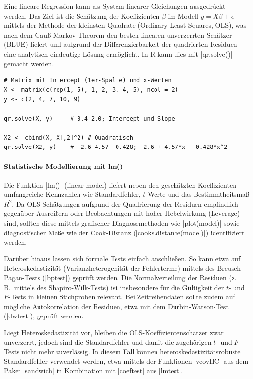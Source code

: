 \documentclass[10pt,twocolumn]{scrartcl}
\renewcommand{\lstinline}{\mycoloredinline}
\begin{document}
Eine lineare Regression kann als System linearer Gleichungen ausgedrückt werden. Das Ziel ist die Schätzung der Koeffizienten $\beta$ im Modell $y = X\beta + \epsilon$ mittels der Methode der kleinsten Quadrate (Ordinary Least Squares, OLS), was nach dem Gauß-Markov-Theorem den besten linearen unverzerrten Schätzer (BLUE) liefert und aufgrund der Differenzierbarkeit der quadrierten Residuen eine analytisch eindeutige Lösung ermöglicht. In R kann dies mit \lstinline|qr.solve()| gemacht werden.

\begin{lstlisting}
# Matrix mit Intercept (1er-Spalte) und x-Werten
X <- matrix(c(rep(1, 5), 1, 2, 3, 4, 5), ncol = 2)
y <- c(2, 4, 7, 10, 9)

qr.solve(X, y)     # 0.4 2.0; Intercept und Slope

X2 <- cbind(X, X[,2]^2) # Quadratisch
qr.solve(X2, y)    # -2.6 4.57 -0.428; -2.6 + 4.57*x - 0.428*x^2
\end{lstlisting}

\paragraph{Statistische Modellierung mit lm()}

Die Funktion \lstinline|lm()| (linear model) liefert neben den geschätzten Koeffizienten umfangreiche Kennzahlen wie Standardfehler, $t$-Werte und das Bestimmtheitsmaß $R^2$. Da OLS-Schätzungen aufgrund der Quadrierung der Residuen empfindlich gegenüber Ausreißern oder Beobachtungen mit hoher Hebelwirkung (Leverage) sind, sollten diese mittels grafischer Diagnosemethoden wie \lstinline|plot(model)| sowie diagnostischer Maße wie der Cook-Distanz (\lstinline|cooks.distance(model)|) identifiziert werden.

Darüber hinaus lassen sich formale Tests einfach anschließen. So kann etwa auf Heteroskedastizität (Varianzheterogenität der Fehlerterme) mittels des Breusch-Pagan-Tests (\lstinline|bptest|) geprüft werden. Die Normalverteilung der Residuen (z.\,B.\ mittels des Shapiro-Wilk-Tests) ist insbesondere für die Gültigkeit der $t$- und $F$-Tests in kleinen Stichproben relevant. Bei Zeitreihendaten sollte zudem auf mögliche Autokorrelation der Residuen, etwa mit dem Durbin-Watson-Test (\lstinline|dwtest|), geprüft werden.

Liegt Heteroskedastizität vor, bleiben die OLS-Koeffizientenschätzer zwar unverzerrt, jedoch sind die Standardfehler und damit die zugehörigen $t$- und $F$-Tests nicht mehr zuverlässig. In diesem Fall können heteroskedastizitätsrobuste Standardfehler verwendet werden, etwa mittels der Funktionen \lstinline|vcovHC| aus dem Paket \lstinline|sandwich| in Kombination mit \lstinline|coeftest| aus \lstinline|lmtest|.
\end{document}
